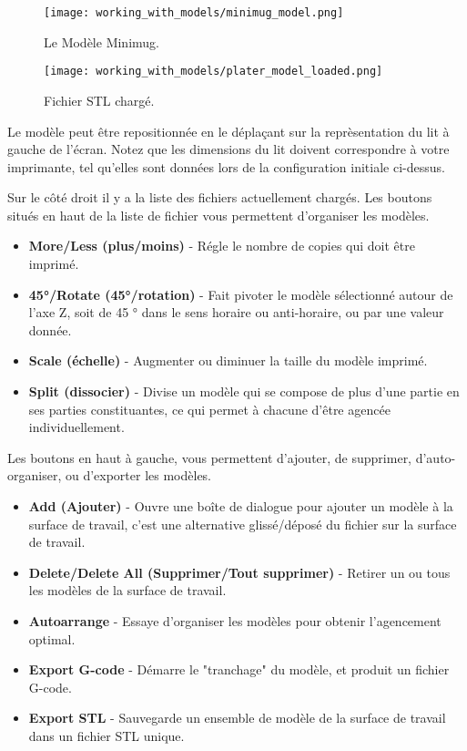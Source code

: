 \begin{figure}[H]
\centering
\texttt{[image: working\_with\_models/minimug\_model.png]}
\caption{Le Mod\`ele Minimug.}
\label{fig:minimug_model}
\end{figure}

\begin{figure}[H]
\centering
\texttt{[image: working\_with\_models/plater\_model\_loaded.png]}
\caption{Fichier STL charg\'e.}
\label{fig:plater_model_loaded}
\end{figure}

Le mod\`ele peut \^etre repositionn\'ee en le d\'eplaçant sur la repr\`esentation du lit \`a gauche de l'\'ecran. Notez que les dimensions du lit doivent correspondre \`a votre imprimante, tel qu'elles sont donn\'ees lors de la configuration initiale ci-dessus.

Sur le c\^ot\'e droit il y a la liste des fichiers actuellement charg\'es. Les boutons situ\'es en haut de la liste de fichier vous permettent d'organiser les mod\`eles.
\begin{itemize}
	\item \textbf{More/Less (plus/moins)}  - R\'egle le nombre de copies qui doit \^etre imprim\'e.
	\item \textbf{45°/Rotate (45°/rotation)}  - Fait pivoter le mod\`ele s\'electionn\'e autour de l'axe Z, soit de 45 ° dans le sens horaire ou anti-horaire, ou par une valeur donn\'ee.
	\item \textbf{Scale (\'echelle)}  - Augmenter ou diminuer la taille du mod\`ele imprim\'e.
	\item \textbf{Split (dissocier)}  - Divise un mod\`ele qui se compose de plus d'une partie en ses parties constituantes, ce qui permet \`a chacune d'\^etre agenc\'ee individuellement.
\end{itemize}


Les boutons en haut \`a gauche, vous permettent d'ajouter, de supprimer, d'auto-organiser, ou d'exporter les mod\`eles.
\begin{itemize}
	\item \textbf{Add (Ajouter)}  - Ouvre une bo\^ite de dialogue pour ajouter un mod\`ele \`a la surface de travail, c'est une alternative gliss\'e/d\'epos\'e du fichier sur la surface de travail.
	\item \textbf{Delete/Delete All (Supprimer/Tout supprimer)}  - Retirer un ou tous les mod\`eles de la surface de travail.
	\item \textbf{Autoarrange}  - Essaye d'organiser les mod\`eles pour obtenir l'agencement optimal.
	\item \textbf{Export G-code}  - D\'emarre le "tranchage" du mod\`ele, et produit un fichier G-code.
	\item \textbf{Export STL}  - Sauvegarde un ensemble de mod\`ele de la surface de travail dans un fichier STL unique.
\end{itemize}


